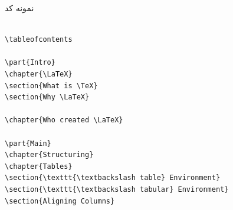 \begin{frame}[fragile]{نمونه کد}
\begin{latin}
\begin{lstlisting}[keywords={begin, end}, keywordstyle=\color{Mulberry}\textbf]

\tableofcontents

\part{Intro}
\chapter{\LaTeX}
\section{What is \TeX}
\section{Why \LaTeX}

\chapter{Who created \LaTeX}

\part{Main}
\chapter{Structuring}
\chapter{Tables}
\section{\texttt{\textbackslash table} Environment}
\section{\texttt{\textbackslash tabular} Environment}
\section{Aligning Columns}

\end{lstlisting}
\end{latin}
\end{frame}

